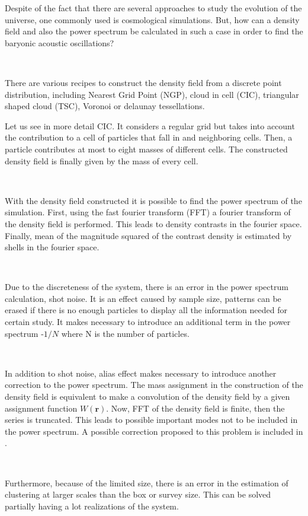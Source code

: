 \documentclass[a4,useAMS,usegraphicx,12pt]{article}
\begin{document}
Despite of the fact that there are several approaches to study the evolution of the universe, one commonly used is cosmological
simulations. But, how can a density field and also the power spectrum be calculated in such a case in order to find the baryonic
acoustic oscillations? 

\

There are various recipes to construct the density field from a discrete point distribution, 
including Nearest Grid Point (NGP), cloud in cell (CIC), triangular shaped cloud (TSC), Voronoi or
delaunay tessellations. 

Let us see in more detail CIC. It considers a regular grid but takes into account the contribution to a cell of particles that fall in and neighboring 
cells. Then, a particle contributes at most to eight masses of different cells. The constructed density field is finally 
given by the mass of every cell. 

\

With the density field constructed it is possible to find the power spectrum of the simulation. First, using the fast fourier transform (FFT)
a fourier transform of the density field is performed.  This leads to density contrasts in the fourier space. Finally, mean of the magnitude
squared of the contrast density is estimated by shells in the fourier space. 

\

Due to the discreteness of the system, there is an error in the power spectrum calculation,  shot noise. 
It is an effect caused by sample size, patterns can be erased if there is no enough particles to display 
all the information needed for certain study. 
It makes necessary to introduce an additional term in the power spectrum -$1/N$ where N is the number of particles. 

\

In addition to shot noise, alias effect makes necessary to introduce another correction to the power spectrum. The mass assignment in the 
construction of the density field is equivalent to make a convolution of the density field by a given assignment function $W(\textbf{r})$.
Now, FFT  of the density field is finite, then the series is truncated. This leads to possible important modes not to be included in the 
power spectrum. A possible correction proposed to this problem is included in \cite{alias}. 

\

Furthermore, because of the limited size, there is an error in the estimation of clustering at larger scales than the box or 
survey size. This can be solved partially having a lot realizations of the system.  
\end{document}
